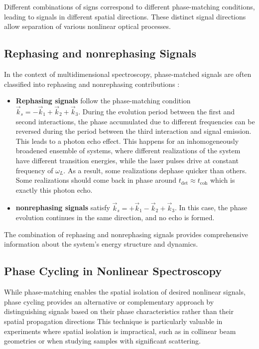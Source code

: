 \noindent Different combinations of signs correspond to different phase-matching conditions, leading to signals in different spatial directions. These distinct signal directions allow separation of various nonlinear optical processes.

\subsection{Rephasing and nonrephasing Signals}
\label{subsec:rephasing_nonrephasing}

\noindent In the context of multidimensional spectroscopy, phase-matched signals are often classified into rephasing and nonrephasing contributions \cite{cho2009twodimensionalopticalspectroscopy, jonas2003twodimensionalfemtosecondspectroscopy}:

\begin{itemize}
	\item \textbf{Rephasing signals} follow the phase-matching condition $\vec{k}_s = -\vec{k}_1 + \vec{k}_2 + \vec{k}_3$. During the evolution period between the first and second interactions, the phase accumulated due to different frequencies can be reversed during the period between the third interaction and signal emission. This leads to a photon echo effect.
 	This happens for an inhomogeneously broadened ensemble of systems, where different realizations of the system have different transition energies, while the laser pulses drive at constant frequency of $\omega_L$. As a result, some realizations dephase quicker than others. Some realizations should come back in phase around $t_{\text{det}} \approx t_{\text{coh}}$ which is exactly this photon echo.


	\item \textbf{nonrephasing signals} satisfy $\vec{k}_s = +\vec{k}_1 - \vec{k}_2 + \vec{k}_3$. In this case, the phase evolution continues in the same direction, and no echo is formed.
\end{itemize}

\noindent The combination of rephasing and nonrephasing signals provides comprehensive information about the system's energy structure and dynamics.

\subsection{Phase Cycling in Nonlinear Spectroscopy}
\label{subsec:phase_cycling}

\noindent While phase-matching enables the spatial isolation of desired nonlinear signals, phase cycling provides an alternative or complementary approach by distinguishing signals based on their phase characteristics rather than their spatial propagation directions %
This technique is particularly valuable in experiments where spatial isolation is impractical, such as in collinear beam geometries or when studying samples with significant scattering.

